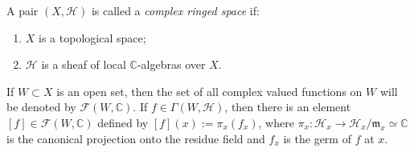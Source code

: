 A pair $(X, \mathcal{H})$ is called a \textit{complex ringed space} if:
\begin{enumerate}
\item $X$ is a topological space;
\item $\mathcal{H}$ is a sheaf of local $\mathbb{C}$-algebras over $X$.
\end{enumerate}
If $W \subset X$ is an open set, then the set of all complex valued functions on $W$ will be denoted by $\mathcal{F}(W, \mathbb{C})$.
If $f \in \Gamma(W, \mathcal{H})$, then there is an element $[f] \in \mathcal{F}(W, \mathbb{C})$ defined by $[f](x) := \pi_x(f_x)$, where $\pi_x: \mathcal{H}_x \to \mathcal{H}_x/\mathfrak{m}_x \simeq \mathbb{C}$ is the canonical projection onto the residue field and $f_x$ is the germ of $f$ at $x$.
